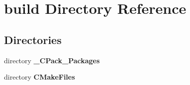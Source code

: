 \section{build Directory Reference}
\label{dir_4fef79e7177ba769987a8da36c892c5f}
\subsection*{Directories}
\begin{DoxyCompactItemize}
\item 
directory {\bf \-\_\-\-C\-Pack\-\_\-\-Packages}
\item 
directory {\bf C\-Make\-Files}
\end{DoxyCompactItemize}
